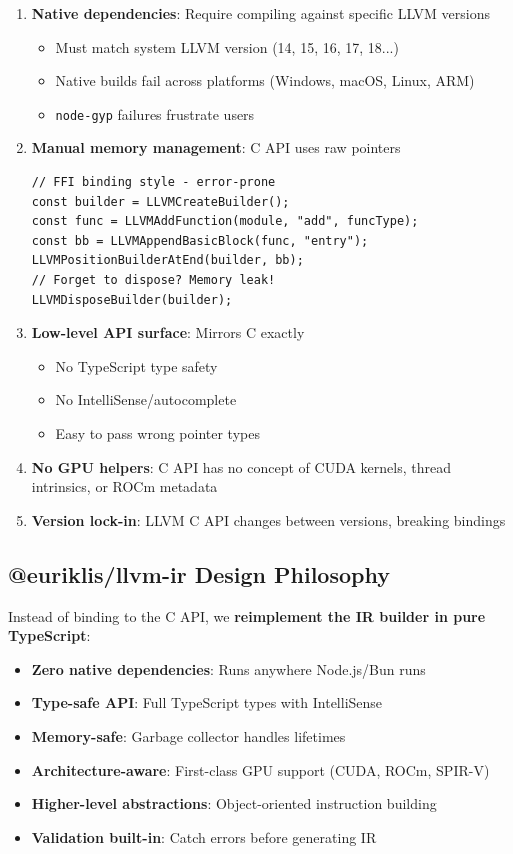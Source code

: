 \documentclass[11pt]{article}
\begin{document}
\begin{enumerate}[noitemsep]
  \item \textbf{Native dependencies}: Require compiling against specific LLVM versions
  \begin{itemize}[noitemsep]
    \item Must match system LLVM version (14, 15, 16, 17, 18...)
    \item Native builds fail across platforms (Windows, macOS, Linux, ARM)
    \item \texttt{node-gyp} failures frustrate users
  \end{itemize}

  \item \textbf{Manual memory management}: C API uses raw pointers
  \begin{lstlisting}[style=ts]
// FFI binding style - error-prone
const builder = LLVMCreateBuilder();
const func = LLVMAddFunction(module, "add", funcType);
const bb = LLVMAppendBasicBlock(func, "entry");
LLVMPositionBuilderAtEnd(builder, bb);
// Forget to dispose? Memory leak!
LLVMDisposeBuilder(builder);
  \end{lstlisting}

  \item \textbf{Low-level API surface}: Mirrors C exactly
  \begin{itemize}[noitemsep]
    \item No TypeScript type safety
    \item No IntelliSense/autocomplete
    \item Easy to pass wrong pointer types
  \end{itemize}

  \item \textbf{No GPU helpers}: C API has no concept of CUDA kernels, thread intrinsics, or ROCm metadata

  \item \textbf{Version lock-in}: LLVM C API changes between versions, breaking bindings
\end{enumerate}

\subsection{@euriklis/llvm-ir Design Philosophy}

Instead of binding to the C API, we \textbf{reimplement the IR builder in pure TypeScript}:

\begin{itemize}[noitemsep]
  \item \textbf{Zero native dependencies}: Runs anywhere Node.js/Bun runs
  \item \textbf{Type-safe API}: Full TypeScript types with IntelliSense
  \item \textbf{Memory-safe}: Garbage collector handles lifetimes
  \item \textbf{Architecture-aware}: First-class GPU support (CUDA, ROCm, SPIR-V)
  \item \textbf{Higher-level abstractions}: Object-oriented instruction building
  \item \textbf{Validation built-in}: Catch errors before generating IR
\end{itemize}
\end{document}
